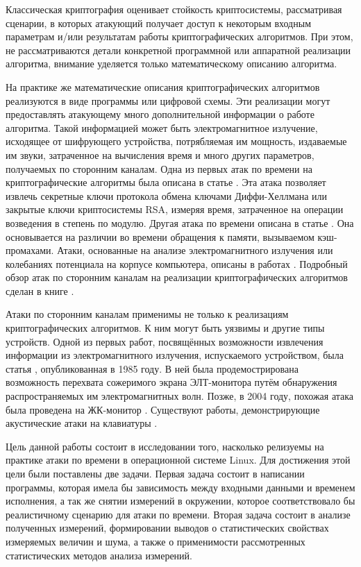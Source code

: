 
Классическая криптография оценивает стойкость криптосистемы, рассматривая
сценарии, в которых атакующий получает доступ к некоторым входным параметрам
и/или результатам работы криптографических алгоритмов. При этом, не
рассматриваются детали конкретной программной или аппаратной реализации
алгоритма, внимание уделяется только математическому описанию алгоритма.

На практике же математические описания криптографических алгоритмов реализуются
в виде программы или цифровой схемы. Эти реализации могут предоставлять
атакующему много дополнительной информации о работе алгоритма. Такой информацией
может быть электромагнитное излучение, исходящее от шифрующего устройства,
потрябляемая им мощность, издаваемые им звуки, затраченное на вычисления время и
много других параметров, получаемых по сторонним каналам. Одна из первых атак по
времени на криптографические алгоритмы была описана в статье \cite{kocher}. Эта
атака позволяет извлечь секретные ключи протокола обмена ключами Диффи-Хеллмана
или закрытые ключи криптосистемы RSA, измеряя время, затраченное на операции
возведения в степень по модулю. Другая атака по времени описана в статье
\cite{bernstein}. Она основывается на различии во времени обращения к памяти,
вызываемом кэш-промахами. Атаки, основанные на анализе электромагнитного
излучения или колебаниях потенциала на корпусе компьютера, описаны в работах
\cite{hands} \cite{em}. Подробный обзор атак по сторонним каналам на реализации
криптографических алгоритмов сделан в книге \cite{cren}.

Атаки по сторонним каналам применимы не только к реализациям криптографических
алгоритмов. К ним могут быть уязвимы и другие типы устройств. Одной из первых
работ, посвящённых возможности извлечения информации из электромагнитного
излучения, испускаемого устройством, была статья \cite{van-eck}, опубликованная
в 1985 году. В ней была продемострирована возможность перехвата сожеримого
экрана ЭЛТ-монитора путём обнаружения распространяемых им электромагнитных волн.
Позже, в 2004 году, похожая атака была проведена на ЖК-монитор \cite{kuhn}.
Существуют работы, демонстрирующие акустические атаки на клавиатуры
\cite{asonov} \cite{zhuang}.

Цель данной работы состоит в исследовании того, насколько релизуемы на практике
атаки по времени в операционной системе Linux. Для достижения этой цели были
поставлены две задачи. Первая задача состоит в написании программы, которая
имела бы зависимость между входными данными и временем исполнения, а так же
снятии измерений в окружении, которое соответствовало бы реалистичному сценарию
для атаки по времени. Вторая задача состоит в анализе полученных измерений,
формировании выводов о статистических свойствах измеряемых величин и шума, а
также о применимости рассмотренных статистических методов анализа измерений.

\clearpage
